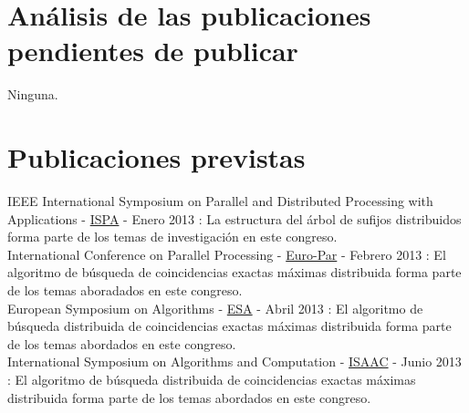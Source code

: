 \documentclass[12pt,a4paper]{article}
\begin{document}
\section{Análisis de las publicaciones pendientes de publicar}
\noindent
Ninguna.
\section{Publicaciones previstas}
IEEE International Symposium on Parallel and Distributed Processing with Applications - \href{http://www.arcos.inf.uc3m.es/ispa12/}{ISPA} - Enero 2013 : La estructura del árbol de sufijos distribuidos forma parte de los temas de investigación en este congreso.\\
International Conference on Parallel Processing - \href{http://www.grs-sim.de/news-events/news-archive/euro-par-2013.html}{Euro-Par} - Febrero 2013 : El algoritmo de búsqueda de coincidencias exactas máximas distribuida forma parte de los temas aboradados en este congreso.\\
European Symposium on Algorithms - \href{http://esa-symposium.org/}{ESA} - Abril 2013 : El algoritmo de búsqueda distribuida de coincidencias exactas máximas distribuida forma parte de los temas abordados en este congreso.\\
International Symposium on Algorithms and Computation - \href{http://www.is.titech.ac.jp/isaac11/}{ISAAC} - Junio 2013 :  El algoritmo de búsqueda distribuida de coincidencias exactas máximas distribuida forma parte de los temas abordados en este congreso.\\
\end{document}
